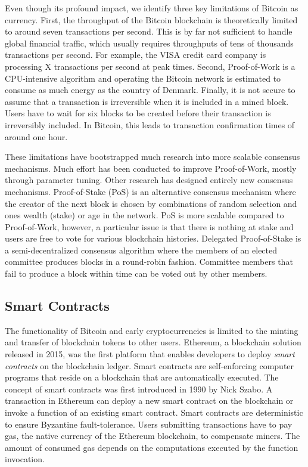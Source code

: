 Even though its profound impact, we identify three key limitations of Bitcoin as currency.
First, the throughput of the Bitcoin blockchain is theoretically limited to around seven transactions per second.
This is by far not sufficient to handle global financial traffic, which usually requires throughputs of tens of thousands transactions per second.
For example, the VISA credit card company is processing X transactions per second at peak times.
Second, Proof-of-Work is a CPU-intensive algorithm and operating the Bitcoin network is estimated to consume as much energy as the country of Denmark.
Finally, it is not secure to assume that a transaction is irreversible when it is included in a mined block.
Users have to wait for six blocks to be created before their transaction is irreversibly included.
In Bitcoin, this leads to transaction confirmation times of around one hour.

These limitations have bootstrapped much research into more scalable consensus mechanisms.
Much effort has been conducted to improve Proof-of-Work, mostly through parameter tuning.
Other research has designed entirely new consensus mechanisms.
Proof-of-Stake (PoS) is an alternative consensus mechanism where the creator of the next block is chosen by combinations of random selection and ones wealth (stake) or age in the network.
PoS is more scalable compared to Proof-of-Work, however, a particular issue is that there is nothing at stake and users are free to vote for various blockchain histories.
Delegated Proof-of-Stake is a semi-decentralized consensus algorithm where the members of an elected committee produces blocks in a round-robin fashion.
Committee members that fail to produce a block within time can be voted out by other members.

\subsection{Smart Contracts}
The functionality of Bitcoin and early cryptocurrencies is limited to the minting and transfer of blockchain tokens to other users.
Ethereum, a blockchain solution released in 2015, was the first platform that enables developers to deploy \emph{smart contracts} on the blockchain ledger.
Smart contracts are self-enforcing computer programs that reside on a blockchain that are automatically executed.
The concept of smart contracts was first introduced in 1990 by Nick Szabo.
A transaction in Ethereum can deploy a new smart contract on the blockchain or invoke a function of an existing smart contract.
Smart contracts are deterministic to ensure Byzantine fault-tolerance.
Users submitting transactions have to pay gas, the native currency of the Ethereum blockchain, to compensate miners.
The amount of consumed gas depends on the computations executed by the function invocation.


